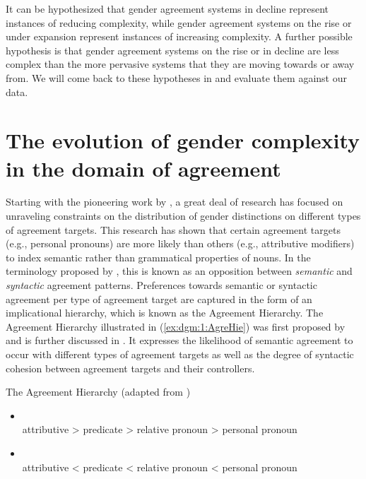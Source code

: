 \documentclass[output=collectionpaper]{langsci/langscibook}
\begin{document}
It can be hypothesized that gender agreement systems in decline represent instances of reducing complexity, while gender agreement systems on the rise or under expansion represent instances of increasing complexity. A further possible hypothesis is that gender agreement systems on the rise or in decline are less complex than the more pervasive systems that they are moving towards or away from. We will come back to these hypotheses in  and evaluate them against our data.



\section{The evolution of gender complexity in the domain of agreement}
\label{sec:dgm:EvAgr}
Starting with the pioneering work by \citet{Corbett1979,Corbett1991}, a great deal of research has focused on unraveling constraints on the distribution of gender distinctions on different types of agreement targets. This research has shown that certain agreement targets (e.g., personal pronouns) are more likely than others (e.g., attributive modifiers) to index semantic rather than grammatical properties of nouns.
In the terminology proposed by \citet{Corbett1979,Corbett1991}, this is known as an opposition between \textit{semantic} and \textit{syntactic} agreement patterns. Preferences towards semantic or syntactic agreement per type of agreement target are captured in the form of an implicational hierarchy, which is known as the Agreement Hierarchy. The Agreement Hierarchy \textendash{} illustrated in (\ref{ex:dgm:1:AgreHie}) \textendash{} was first proposed by \citet{Corbett1979} and is further discussed in \citet{Corbett1991,Corbett2000,Corbett2006}. It expresses the likelihood of semantic agreement to occur with different types of agreement targets as well as the degree of syntactic cohesion between agreement targets and their controllers.

\ea\label{ex:dgm:1:AgreHie}
The Agreement Hierarchy (adapted from \citealt{Corbett2010})\\
\begin{itemize}

\item {}\\
attributive {\textgreater}  predicate  {\textgreater} relative pronoun {\textgreater} personal pronoun

\item {}\\
attributive  {\textless} predicate {\textless} relative pronoun {\textless}  personal pronoun

\end{itemize}
\z
\end{document}

